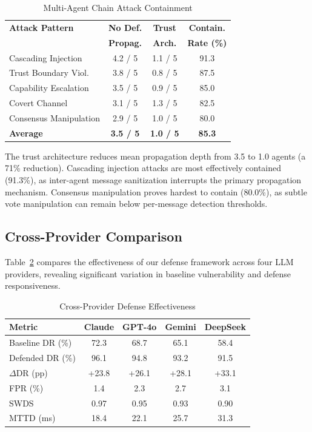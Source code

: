 \begin{table}[!t]
\centering
\caption{Multi-Agent Chain Attack Containment}
\label{tab:chain_results}
\renewcommand{\arraystretch}{1.15}
\begin{tabular}{@{}lccc@{}}
\toprule
\textbf{Attack Pattern} & \textbf{No Def.} & \textbf{Trust} & \textbf{Contain.} \\
 & \textbf{Propag.} & \textbf{Arch.} & \textbf{Rate (\%)} \\
\midrule
Cascading Injection    & 4.2 / 5 & 1.1 / 5 & 91.3 \\
Trust Boundary Viol.   & 3.8 / 5 & 0.8 / 5 & 87.5 \\
Capability Escalation  & 3.5 / 5 & 0.9 / 5 & 85.0 \\
Covert Channel         & 3.1 / 5 & 1.3 / 5 & 82.5 \\
Consensus Manipulation & 2.9 / 5 & 1.0 / 5 & 80.0 \\
\midrule
\textbf{Average}       & \textbf{3.5 / 5} & \textbf{1.0 / 5} & \textbf{85.3} \\
\bottomrule
\end{tabular}
\end{table}

The trust architecture reduces mean propagation depth from 3.5 to 1.0 agents (a 71\% reduction). Cascading injection attacks are most effectively contained (91.3\%), as inter-agent message sanitization interrupts the primary propagation mechanism. Consensus manipulation proves hardest to contain (80.0\%), as subtle vote manipulation can remain below per-message detection thresholds.

\subsection{Cross-Provider Comparison}

Table~\ref{tab:cross_provider} compares the effectiveness of our defense framework across four LLM providers, revealing significant variation in baseline vulnerability and defense responsiveness.

\begin{table}[!t]
\centering
\caption{Cross-Provider Defense Effectiveness}
\label{tab:cross_provider}
\renewcommand{\arraystretch}{1.15}
\begin{tabular}{@{}lcccc@{}}
\toprule
\textbf{Metric} & \textbf{Claude} & \textbf{GPT-4o} & \textbf{Gemini} & \textbf{DeepSeek} \\
\midrule
Baseline DR (\%)       & 72.3 & 68.7 & 65.1 & 58.4 \\
Defended DR (\%)       & 96.1 & 94.8 & 93.2 & 91.5 \\
$\Delta$DR (pp)        & +23.8 & +26.1 & +28.1 & +33.1 \\
FPR (\%)               & 1.4  & 2.3  & 2.7  & 3.1  \\
SWDS                   & 0.97 & 0.95 & 0.93 & 0.90 \\
MTTD (ms)              & 18.4 & 22.1 & 25.7 & 31.3 \\
\bottomrule
\end{tabular}
\end{table}

